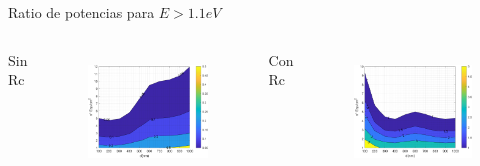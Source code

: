 \documentclass[spanish,a4paper]{beamer}%
\newcommand{\resRelPath}{\graphicspath{{./figuras/Resultados/RelacionCondRad/}}}
\begin{document}
		\begin{frame}{Ratio de potencias para {$E>1.1eV$}}
			\resRelPath
			\begin{columns}
						\begin{block}{\centering Sin Rc}
						\end{block}
					\vspace{10pt}
						\begin{figure}[h]%
								\centering
										\includegraphics[width=\columnwidth]{rel_SiSi11}
								\label{fig:SiSiO2Si_rel}%
						\end{figure}
						\vfill
					\vspace{-12pt}
						\begin{block}{\centering Con Rc}
							\end{block}
					\vspace{10pt}
						\begin{figure}[h]%
								\centering
										\includegraphics[width=\columnwidth]{rel_SiSi11_Rc}%
								\label{fig:SiSiO2Si_relRc}%
						\end{figure}
						\vfill
				\end{columns}		
	\end{frame}
\end{document}
